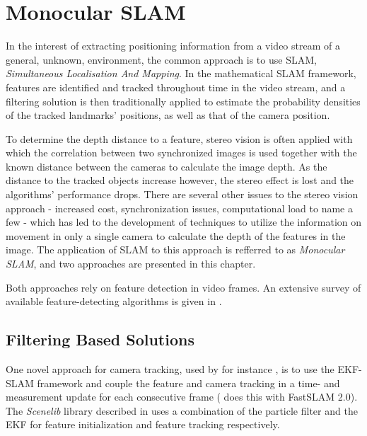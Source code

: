 \chapter{Monocular SLAM}
\label{cha:monoslam}
    In the interest of extracting positioning information from a video stream
    of a general, unknown, environment, the common approach is to use SLAM,
    \textit{Simultaneous Localisation And Mapping}.
    In the mathematical SLAM framework, features are identified and tracked throughout time
    in the video stream, and a filtering solution is then traditionally applied
    to estimate the probability densities of the tracked landmarks' positions, as well as
    that of the camera position.

    To determine the depth distance to a feature, stereo vision is often applied
    with which the correlation between two synchronized images is used together with the known
    distance between the cameras to calculate the image depth.
    As the distance to the tracked objects increase however, the stereo
    effect is lost and the algorithms' performance drops.
    There are several other issues to the stereo vision approach - increased
    cost, synchronization issues, computational load to name a few - which has
    led to the development of techniques to utilize the information on movement in only a single
    camera to calculate the depth of the features in the image.
    The application of SLAM to this approach is refferred to as \textit{Monocular SLAM},
    and two approaches are presented in this chapter.

    Both approaches rely on feature detection in video frames.
    An extensive survey of available feature-detecting algorithms
    is given in \citep{idris09reviewoffeaturedetection}.

    \section{Filtering Based Solutions}
        \label{sec:video:filtersolutions}
        One novel approach for camera tracking, used by for instance \citep{DBLP:conf/iccv/Davison03},
        is to use the EKF-SLAM framework and couple the feature
        and camera tracking in a time- and measurement update for each consecutive
        frame (\citep{Eade:2006:SMS:1153170.1153506} does this with FastSLAM 2.0).
        The \textit{Scenelib} library described in \citep{DBLP:conf/iccv/Davison03}
        uses a combination of the particle filter and the EKF for feature initialization
        and feature tracking respectively.

